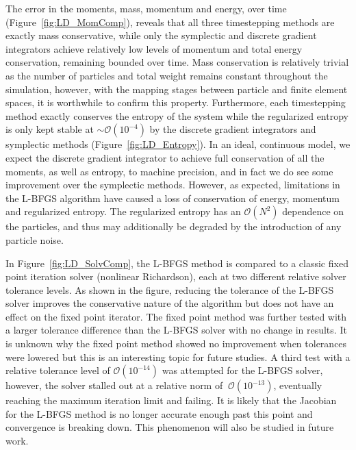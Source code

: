 \documentclass[preprint,12pt]{elsarticle}
\theoremstyle{definition}
\begin{document}
The error in the moments, mass, momentum and energy, over time (Figure~\ref{fig:LD_MomComp}), reveals that all three timestepping methods are exactly mass conservative, while only the symplectic and discrete gradient integrators achieve relatively low levels of momentum and total energy conservation, remaining bounded over time. Mass conservation is relatively trivial as the number of particles and total weight remains constant throughout the simulation, however, with the mapping stages between particle and finite element spaces, it is worthwhile to confirm this property. Furthermore, each timestepping method exactly conserves the entropy of the system while the regularized entropy is only kept stable at $\sim \mathcal{O} (10^{-4})$ by the discrete gradient integrators and symplectic methods (Figure~\ref{fig:LD_Entropy}). In an ideal, continuous model, we expect the discrete gradient integrator to achieve full conservation of all the moments, as well as entropy, to machine precision, and in fact we do see some improvement over the symplectic methods. However, as expected, limitations in the L-BFGS algorithm have caused a loss of conservation of energy, momentum and regularized entropy. The regularized entropy has an $\mathcal{O} (N^2)$ dependence on the particles, and thus may additionally be degraded by the introduction of any particle noise.

In Figure~\ref{fig:LD_SolvComp}, the L-BFGS method is compared to a classic fixed point iteration solver (nonlinear Richardson), each at two different relative solver tolerance levels. As shown in the figure, reducing the tolerance of the L-BFGS solver improves the conservative nature of the algorithm but does not have an effect on the fixed point iterator. The fixed point method was further tested with a larger tolerance difference than the L-BFGS solver with no change in results. It is unknown why the fixed point method showed no improvement when tolerances were lowered but this is an interesting topic for future studies. A third test with a relative tolerance level of $\mathcal{O} (10^{-14})$ was attempted for the L-BFGS solver, however, the solver stalled out at a relative norm of $~\mathcal{O} (10^{-13})$, eventually reaching the maximum iteration limit and failing. It is likely that the Jacobian for the L-BFGS method is no longer accurate enough past this point and convergence is breaking down. This phenomenon will also be studied in future work.
\end{document}
